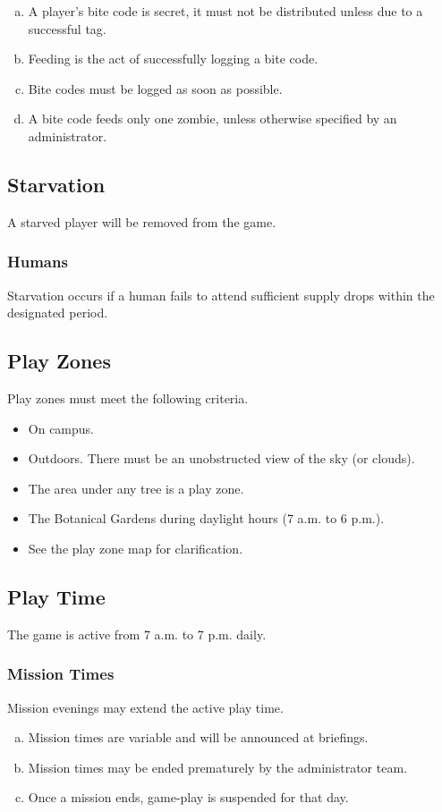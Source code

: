 \documentclass[a4paper,12pt]{article}
\begin{document}
\begin{enumerate}[(a)]
    \item A player's bite code is secret, it must not be distributed unless due to a successful tag.
    \item Feeding is the act of successfully logging a bite code.
    \item Bite codes must be logged as soon as possible.
    \item A bite code feeds only one zombie, unless otherwise specified by an administrator.
\end{enumerate}

\subsection{Starvation}
A starved player will be removed from the game.
    \subsubsection{Humans}
    Starvation occurs if a human fails to attend sufficient supply drops within the designated period.

\subsection{Play Zones}
Play zones must meet the following criteria.
\begin{itemize}
    \item On campus.
    \item Outdoors. There must be an unobstructed view of the sky (or clouds).
    \item The area under any tree is a play zone. 
    \item The Botanical Gardens during daylight hours (7 a.m. to 6 p.m.).
    \item See the play zone map for clarification.
\end{itemize}

\subsection{Play Time}
The game is active from 7 a.m. to 7 p.m. daily.
\subsubsection{Mission Times}
Mission evenings may extend the active play time.
\begin{enumerate}[(a)]
    \item Mission times are variable and will be announced at briefings.
    \item Mission times may be ended prematurely by the administrator team.
    \item Once a mission ends, game-play is suspended for that day.
\end{enumerate}
\end{document}

